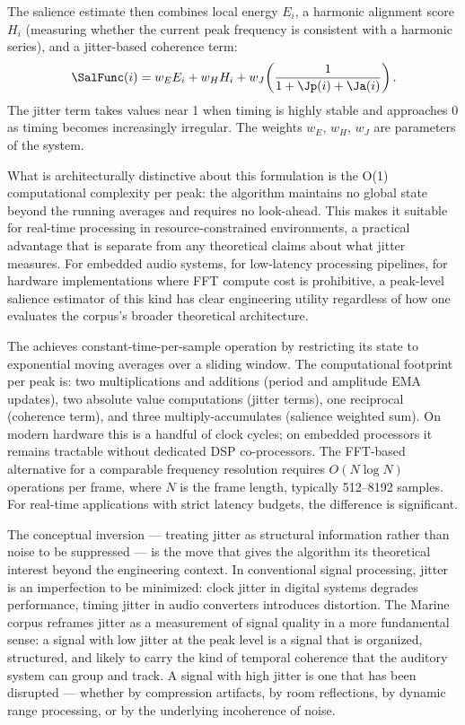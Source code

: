 The salience estimate then combines local energy $E_i$, a harmonic
alignment score $H_i$ (measuring whether the current peak frequency
is consistent with a harmonic series), and a jitter-based coherence
term:
\[
  \SalFunc(i) = w_E E_i + w_H H_i
  + w_J\!\left(\frac{1}{1 + \Jp(i) + \Ja(i)}\right).
\]
The jitter term takes values near 1 when timing is highly stable
and approaches 0 as timing becomes increasingly irregular. The
weights $w_E$, $w_H$, $w_J$ are parameters of the system.

What is architecturally distinctive about this formulation is the
O(1) computational complexity per peak: the algorithm maintains
no global state beyond the running averages and requires no look-ahead.
This makes it suitable for real-time processing in resource-constrained
environments, a practical advantage that is separate from any
theoretical claims about what jitter measures. For embedded audio
systems, for low-latency processing pipelines, for hardware
implementations where FFT compute cost is prohibitive, a peak-level
salience estimator of this kind has clear engineering utility
regardless of how one evaluates the corpus's broader theoretical
architecture.

\begin{technote}
The \Marine{} achieves constant-time-per-sample operation by
restricting its state to exponential moving averages over a sliding
window. The computational footprint per peak is:
two multiplications and additions (period and amplitude EMA
updates), two absolute value computations (jitter terms), one
reciprocal (coherence term), and three multiply-accumulates
(salience weighted sum). On modern hardware this is a handful of
clock cycles; on embedded processors it remains tractable without
dedicated DSP co-processors. The FFT-based alternative for a
comparable frequency resolution requires $O(N \log N)$ operations
per frame, where $N$ is the frame length, typically 512--8192
samples. For real-time applications with strict latency budgets,
the difference is significant.
\end{technote}

The conceptual inversion --- treating jitter as structural
information rather than noise to be suppressed --- is the move
that gives the algorithm its theoretical interest beyond the
engineering context. In conventional signal processing, jitter
is an imperfection to be minimized: clock jitter in digital systems
degrades performance, timing jitter in audio converters introduces
distortion. The Marine corpus reframes jitter as a measurement of
signal quality in a more fundamental sense: a signal with low
jitter at the peak level is a signal that is organized, structured,
and likely to carry the kind of temporal coherence that the
auditory system can group and track. A signal with high jitter
is one that has been disrupted --- whether by compression artifacts,
by room reflections, by dynamic range processing, or by the
underlying incoherence of noise.

